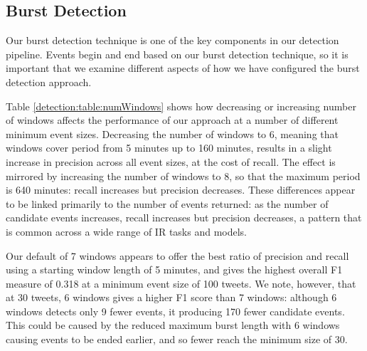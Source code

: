 \subsection{Burst Detection}
\label{detection:sec:burstDetection}

Our burst detection technique is one of the key components in our detection pipeline.
Events begin and end based on our burst detection technique, so it is important that we examine different aspects of how we have configured the burst detection approach.

Table \ref{detection:table:numWindows} shows how decreasing or increasing number of windows affects the performance of our approach at a number of different minimum event sizes.
Decreasing the number of windows to 6, meaning that windows cover period from 5 minutes up to 160 minutes, results in a slight increase in precision across all event sizes, at the cost of recall.
The effect is mirrored by increasing the number of windows to 8, so that the maximum period is 640 minutes: recall increases but precision decreases.
These differences appear to be linked primarily to the number of events returned: as the number of candidate events increases, recall increases but precision decreases, a pattern that is common across a wide range of IR tasks and models.

Our default of 7 windows appears to offer the best ratio of precision and recall using a starting window length of 5 minutes, and gives the highest overall F1 measure of 0.318 at a minimum event size of 100 tweets.
We note, however, that at 30 tweets, 6 windows gives a higher F1 score than 7 windows: although 6 windows detects only 9 fewer events, it producing 170 fewer candidate events.
This could be caused by the reduced maximum burst length with 6 windows causing events to be ended earlier, and so fewer reach the minimum size of 30.

